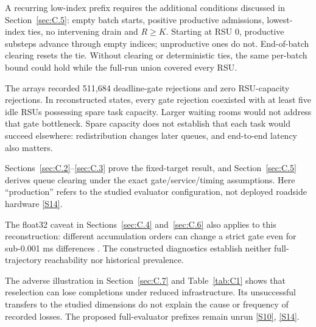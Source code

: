 \documentclass[12pt,a4paper]{article}
\begin{document}
A recurring low-index prefix requires the additional conditions discussed in Section~\ref{sec:C.5}: empty batch starts, positive productive admissions, lowest-index ties, no intervening drain and $R\geq K$. Starting at RSU 0, productive substeps advance through empty indices; unproductive ones do not. End-of-batch clearing resets the tie. Without clearing or deterministic ties, the same per-batch bound could hold while the full-run union covered every RSU.

The arrays recorded 511,684 deadline-gate rejections and zero RSU-capacity rejections. In reconstructed states, every gate rejection coexisted with at least five idle RSUs possessing spare task capacity. Larger waiting rooms would not address that gate bottleneck. Spare capacity does not establish that each task would succeed elsewhere: redistribution changes later queues, and end-to-end latency also matters.

Sections~\ref{sec:C.2}--\ref{sec:C.3} prove the fixed-target result, and Section~\ref{sec:C.5} derives queue clearing under the exact gate/service/timing assumptions. Here ``production'' refers to the studied evaluator configuration, not deployed roadside hardware \hyperref[source-s14]{[S14]}.





The float32 caveat in Sections~\ref{sec:C.4} and~\ref{sec:C.6} also applies to this reconstruction: different accumulation orders can change a strict gate even for sub-0.001 ms differences \cite{ref41}. The constructed diagnostics establish neither full-trajectory reachability nor historical prevalence.

The adverse illustration in Section~\ref{sec:C.7} and Table~\ref{tab:C1} shows that reselection can lose completions under reduced infrastructure. Its unsuccessful transfers to the studied dimensions do not explain the cause or frequency of recorded losses. The proposed full-evaluator prefixes remain unrun \hyperref[source-s10]{[S10]}, \hyperref[source-s14]{[S14]}.
\end{document}
